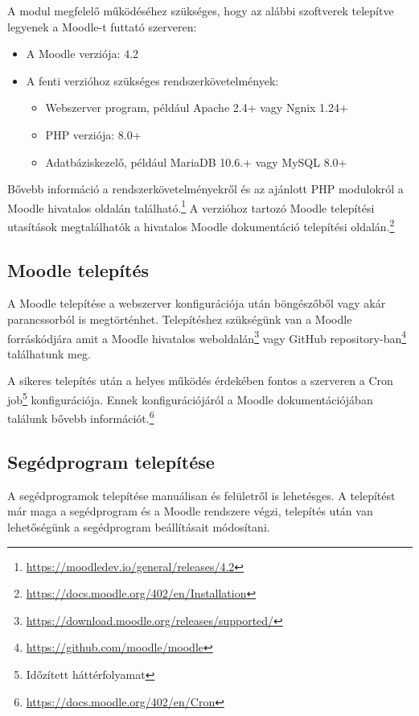 A modul megfelelő működéséhez szükséges, hogy az alábbi szoftverek telepítve legyenek a Moodle-t futtató szerveren:

\begin{itemize}
    \item A Moodle verziója: 4.2
    \item A fenti verzióhoz szükséges rendszerkövetelmények:

\begin{itemize}
        \item Webszerver program, például Apache 2.4+ vagy Ngnix 1.24+
        \item PHP verziója: 8.0+
        \item Adatbáziskezelő, például MariaDB 10.6.+ vagy MySQL 8.0+
\end{itemize}

\end{itemize}
Bővebb információ a rendszerkövetelményekről és az ajánlott PHP modulokról a Moodle hivatalos oldalán található.\footnote{\url{https://moodledev.io/general/releases/4.2}}  A verzióhoz tartozó Moodle telepítési utasítások megtalálhatók a hivatalos Moodle dokumentáció telepítési oldalán.\footnote{\url{https://docs.moodle.org/402/en/Installation}} 
 
\subsection{Moodle telepítés}

A Moodle telepítése a webszerver konfigurációja után böngészőből vagy akár parancssorból is megtörténhet. Telepítéshez szükségünk van a Moodle forráskódjára amit a Moodle hivatalos weboldalán\footnote{\url{https://download.moodle.org/releases/supported/}} vagy GitHub repository-ban\footnote{\url{https://github.com/moodle/moodle}} találhatunk meg. 

A sikeres telepítés után a helyes működés érdekében fontos a szerveren a Cron job\footnote{Időzített háttérfolyamat} konfigurációja. Ennek konfigurációjáról a Moodle dokumentációjában találunk bővebb információt.\footnote{\url{https://docs.moodle.org/402/en/Cron}}

\subsection{Segédprogram telepítése}

A segédprogramok telepítése manuálisan és felületről is lehetésges. A telepítést már maga a segédprogram és a Moodle rendszere végzi, telepítés után van lehetőségünk a segédprogram beállításait módosítani.

